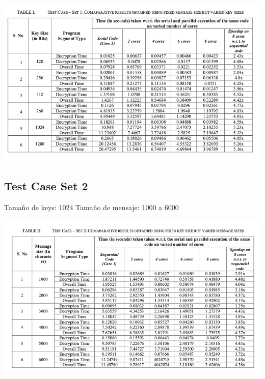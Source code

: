 \documentclass[a4paper,12pt]{article}
\begin{document}
\includegraphics[scale = 0.5]{2.png}

\subsection{Test Case Set 2}

Tamaño de keys: 1024
Tamaño de mensaje: 1000 a 6000

\includegraphics[scale = 0.5]{3.png}
\end{document}
